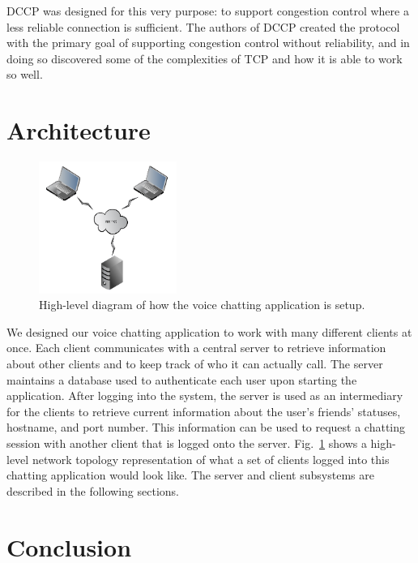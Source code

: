 \documentclass[letterpaper, 9 pt, balance, conference]{ieeeconf}
\begin{document}
DCCP was designed for this very purpose: to support congestion control where a
less reliable connection is sufficient. The authors of DCCP created the protocol
with the primary goal of supporting congestion control without reliability, and
in doing so discovered some of the complexities of TCP and how it is able to
work so well.

\section{Architecture}
\label{sec:architec}

\begin{figure}[h]
   \centering
      \includegraphics[width=0.4\textwidth]{pics/setup}
   \caption{High-level diagram of how the voice chatting application is setup.}
\label{fig:setup}
\end{figure}

We designed our voice chatting application to work with many different clients
at once. Each client communicates with a central server to retrieve information
about other clients and to keep track of who it can actually call. The
server maintains a database used to authenticate each user upon starting the
application. After logging into the system, the server is used as an
intermediary for the clients to retrieve current information about the user's
friends' statuses, hostname, and port number. This information can be used to
request a chatting session with another client that is logged onto the server. 
Fig.~\ref{fig:setup} shows a high-level network topology representation of what
a set of clients logged into this chatting application would look like. The
server and client subsystems are described in the following sections.







\section{Conclusion}
\label{sec:concl}
\end{document}
